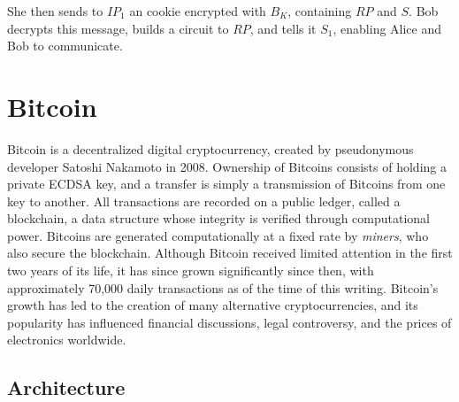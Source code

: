 She then sends to $IP_{1}$ an cookie encrypted with $B_{K}$, containing $RP$ and $S$. Bob decrypts this message, builds a circuit to $RP$, and tells it $S_{1}$, enabling Alice and Bob to communicate.





\section{Bitcoin} 

Bitcoin is a decentralized digital cryptocurrency, created by pseudonymous developer Satoshi Nakamoto in 2008. Ownership of Bitcoins consists of holding a private ECDSA key, and a transfer is simply a transmission of Bitcoins from one key to another. All transactions are recorded on a public ledger, called a blockchain, a data structure whose integrity is verified through computational power. Bitcoins are generated computationally at a fixed rate by \textit{miners}, who also secure the blockchain. Although Bitcoin received limited attention in the first two years of its life, it has since grown significantly since then, with approximately 70,000 daily transactions as of the time of this writing. Bitcoin's growth has led to the creation of many alternative cryptocurrencies, and its popularity has influenced financial discussions, legal controversy, and the prices of electronics worldwide.

\subsection{Architecture}

